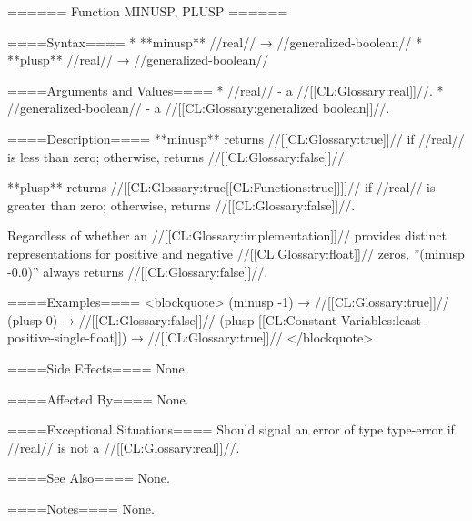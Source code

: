 ====== Function MINUSP, PLUSP ======

====Syntax====
  * **minusp** //real// → //generalized-boolean//
  * **plusp** //real// → //generalized-boolean//

====Arguments and Values====
  * //real// - a //[[CL:Glossary:real]]//.
  * //generalized-boolean// - a //[[CL:Glossary:generalized boolean]]//.

====Description====
**minusp** returns //[[CL:Glossary:true]]// if //real// is less than zero; otherwise, returns //[[CL:Glossary:false]]//.

**plusp**  returns //[[CL:Glossary:true[[CL:Functions:true]]]]// if //real// is greater than zero; otherwise, returns //[[CL:Glossary:false]]//.

Regardless of whether an //[[CL:Glossary:implementation]]// provides distinct representations for positive and negative //[[CL:Glossary:float]]// zeros, ''(minusp -0.0)'' always returns //[[CL:Glossary:false]]//.

====Examples====
<blockquote>
(minusp -1) → //[[CL:Glossary:true]]// 
(plusp 0) → //[[CL:Glossary:false]]// 
(plusp [[CL:Constant Variables:least-positive-single-float]]) → //[[CL:Glossary:true]]// 
</blockquote>

====Side Effects====
None.

====Affected By====
None.

====Exceptional Situations====
Should signal an error of type type-error if //real// is not a //[[CL:Glossary:real]]//.

====See Also====
None.

====Notes====
None.

